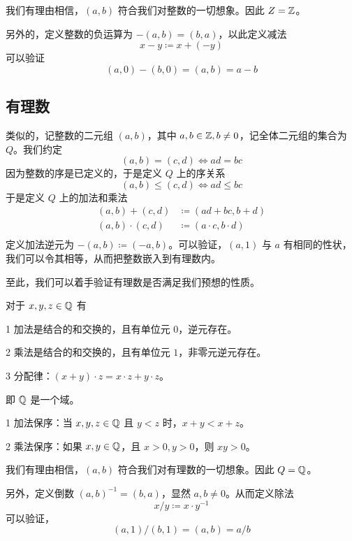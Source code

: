 我们有理由相信，$(a,b)$ 符合我们对整数的一切想象。因此 $Z = \mathbb{Z}$。

另外的，定义整数的负运算为 $-(a,b) = (b,a)$，以此定义减法
$$x - y \coloneqq  x + (-y)$$
可以验证
$$(a,0) - (b,0) = (a,b) = a - b$$

\subsection{有理数}

类似的，记整数的二元组 $(a,b)$，其中 $a,b\in \mathbb{Z},b\ne 0$，记全体二元组的集合为 $Q$。我们约定
$$(a,b) = (c,d) \Leftrightarrow ad = bc$$
因为整数的序是已定义的，于是定义 $Q$ 上的序关系
$$(a,b) \leqslant (c,d) \Leftrightarrow ad \leqslant bc$$
于是定义 $Q$ 上的加法和乘法
\begin{equation*}
	\begin{aligned}
		(a,b) + (c,d) &\coloneqq  (ad+bc,b+d)\\
		(a,b) \cdot (c,d) &\coloneqq  (a \cdot c,b \cdot d)\\
	\end{aligned}
\end{equation*}
定义加法逆元为 $-(a,b) \coloneqq  (-a,b)$。可以验证，$(a,1)$ 与 $a$ 有相同的性状，我们可以令其相等，从而把整数嵌入到有理数内。

至此，我们可以着手验证有理数是否满足我们预想的性质。

\begin{theorem}[$\QQ$ 的代数算律]
	对于 $x,y,z\in \mathbb{Q}$ 有

	\num{1} 加法是结合的和交换的，且有单位元 $0$，逆元存在。

	\num{2} 乘法是结合的和交换的，且有单位元 $1$，非零元逆元存在。

	\num{3} 分配律：$(x+y) \cdot  z = x \cdot z + y\cdot z$。
\end{theorem}

即 $\QQ$ 是一个域。

\begin{theorem}[$\QQ$ 是有序域]
	\num{1} 加法保序：当 $x,y,z\in \mathbb{Q}$ 且 $y<z$ 时，$x+y<x+z$。

	\num{2} 乘法保序：如果 $x,y\in \mathbb{Q}$，且 $x>0,y>0$，则 $xy>0$。
\end{theorem}

我们有理由相信，$(a,b)$ 符合我们对有理数的一切想象。因此 $Q = \mathbb{Q}$。

另外，定义倒数 $(a,b)^{-1} = (b,a)$，显然 $a,b\ne 0$。从而定义除法
$$x/y \coloneqq  x \cdot y^{-1}$$
可以验证，
$$(a,1)/(b,1) = (a,b) = a/b$$

